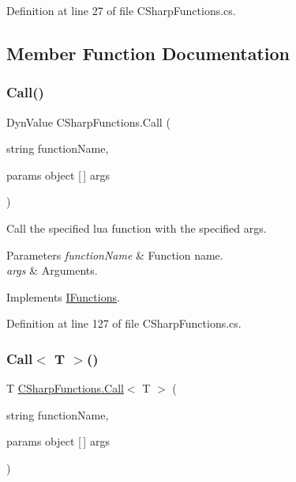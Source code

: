 Definition at line 27 of file C\+Sharp\+Functions.\+cs.



\subsection{Member Function Documentation}
\mbox{\label{class_c_sharp_functions_a6c500d1a443f10a60c96819583cc3168}} 
\subsubsection{\texorpdfstring{Call()}{Call()}}
{\footnotesize\ttfamily Dyn\+Value C\+Sharp\+Functions.\+Call (\begin{DoxyParamCaption}\item[{string}]{function\+Name,  }\item[{params object \mbox{[}$\,$\mbox{]}}]{args }\end{DoxyParamCaption})}



Call the specified lua function with the specified args. 


\begin{DoxyParams}{Parameters}
{\em function\+Name} & Function name.\\
\hline
{\em args} & Arguments.\\
\hline
\end{DoxyParams}


Implements \hyperlink{interface_i_functions_a0d5502d86d4b34c04f36d7f8a41c5f27}{I\+Functions}.



Definition at line 127 of file C\+Sharp\+Functions.\+cs.

\mbox{\label{class_c_sharp_functions_aaa94615d2df3daab6e2d22a4b257d2e0}} 
\subsubsection{\texorpdfstring{Call$<$ T $>$()}{Call< T >()}}
{\footnotesize\ttfamily T \hyperlink{class_c_sharp_functions_a6c500d1a443f10a60c96819583cc3168}{C\+Sharp\+Functions.\+Call}$<$ T $>$ (\begin{DoxyParamCaption}\item[{string}]{function\+Name,  }\item[{params object \mbox{[}$\,$\mbox{]}}]{args }\end{DoxyParamCaption})}



